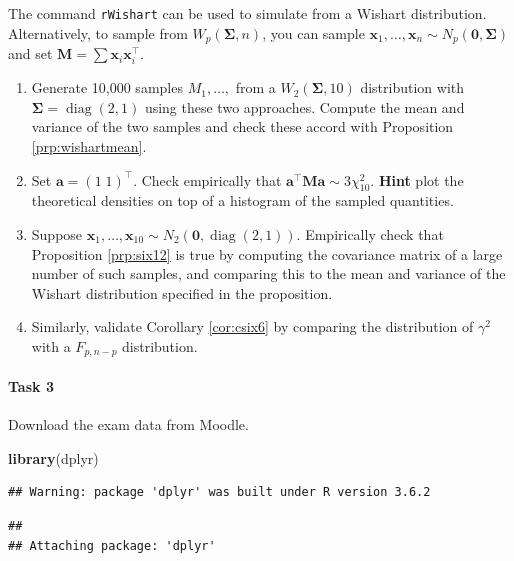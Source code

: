 \documentclass[]{book}
\newenvironment{Shaded}{\begin{snugshade}}{\end{snugshade}}
\newcommand{\KeywordTok}[1]{\textcolor[rgb]{0.13,0.29,0.53}{\textbf{#1}}}
\newcommand{\NormalTok}[1]{#1}
\let\oldparagraph\paragraph
\renewcommand{\paragraph}[1]{\oldparagraph{#1}\mbox{}}
\theoremstyle{definition}
\theoremstyle{definition}
\theoremstyle{definition}
\theoremstyle{remark}
\begin{document}
The command \texttt{rWishart} can be used to simulate from a Wishart distribution. Alternatively, to sample from \(W_p(\boldsymbol{\Sigma},n)\), you can sample \(\mathbf x_1, \ldots, \mathbf x_n \sim N_p(\boldsymbol 0, \boldsymbol{\Sigma})\) and set \(\mathbf M= \sum \mathbf x_i \mathbf x_i^\top\).

\begin{enumerate}
\def\labelenumi{\roman{enumi}.}
\item
  Generate 10,000 samples \(M_1, \ldots,\) from a \(W_2(\boldsymbol{\Sigma}, 10)\) distribution with \(\boldsymbol{\Sigma}= \operatorname{diag}(2,1)\) using these two approaches. Compute the mean and variance of the two samples and check these accord with Proposition \ref{prp:wishartmean}.
\item
  Set \(\mathbf a= (1\; 1)^\top\). Check empirically that \(\mathbf a^\top \mathbf M\mathbf a\sim 3 \chi^2_{10}\).
  \textbf{Hint} plot the theoretical densities on top of a histogram of the sampled quantities.
\item
  Suppose \(\mathbf x_1, \ldots, \mathbf x_{10} \sim N_2(\boldsymbol 0, \operatorname{diag}(2,1))\). Empirically check that Proposition \ref{prp:six12} is true by computing the covariance matrix of a large number of such samples, and comparing this to the mean and variance of the Wishart distribution specified in the proposition.
\item
  Similarly, validate Corollary \ref{cor:csix6} by comparing the distribution of \(\gamma^2\) with a \(F_{p, n-p}\) distribution.
\end{enumerate}

\hypertarget{task-3-2}{%
\paragraph{Task 3}\label{task-3-2}}

Download the exam data from Moodle.

\begin{Shaded}
\begin{Highlighting}[]
\KeywordTok{library}\NormalTok{(dplyr)}
\end{Highlighting}
\end{Shaded}

\begin{verbatim}
## Warning: package 'dplyr' was built under R version 3.6.2
\end{verbatim}

\begin{verbatim}
## 
## Attaching package: 'dplyr'
\end{verbatim}
\end{document}
